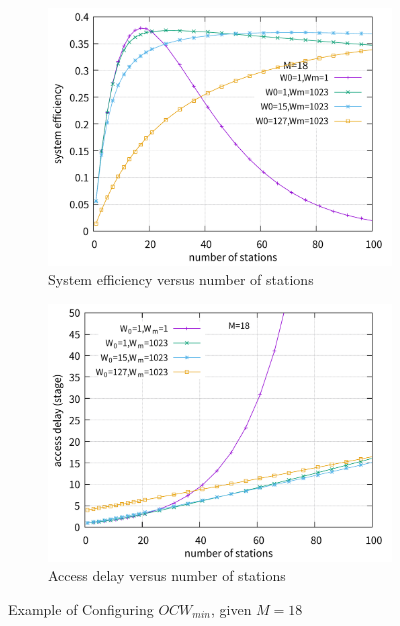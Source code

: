 \documentclass[journal]{IEEEtran}
\begin{document}
\begin{figure}[!ht]
\centering
\begin{subfigure}{0.5\textwidth}  
  \centering  
  \includegraphics[scale=0.38]{./figure/Section_perf_eval/Wm/n_eff_perf_Wm1023.pdf}  
    \caption{System efficiency versus number of stations}   
    \label{fig_n_eff_W0}
\end{subfigure}   

\begin{subfigure}{0.5\textwidth}
	\centering
\includegraphics[scale=.38]{./figure/Section_perf_eval/Wm/n_delay_perf_Wm1023.pdf}
\caption{Access delay versus number of stations}
\label{fig_n_delay_W0}
\end{subfigure}
\caption{Example of Configuring $OCW_{min}$, given $M=18$}
\label{fig_W0}
\end{figure}
\end{document}
